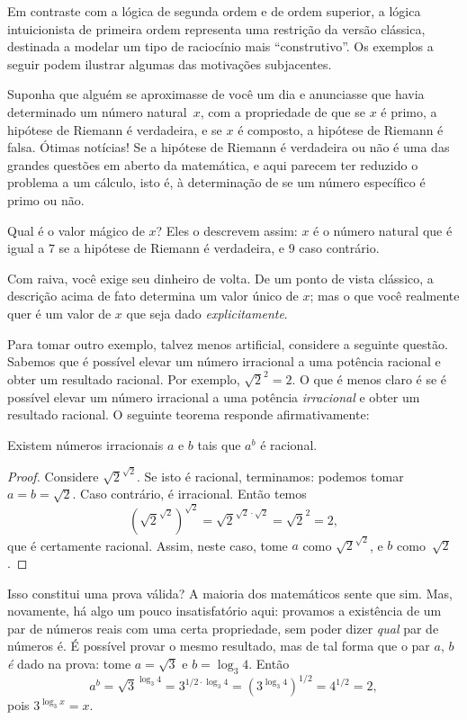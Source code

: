 \documentclass[../../../include/open-logic-section]{subfiles}
\begin{document}


Em contraste com a lógica de segunda ordem e de ordem superior, a lógica
intuicionista de primeira ordem representa uma restrição da versão
clássica, destinada a modelar um tipo de raciocínio mais
``construtivo''. Os exemplos a seguir podem ilustrar algumas das
motivações subjacentes.

Suponha que alguém se aproximasse de você um dia e anunciasse que havia
determinado um número natural~$x$, com a propriedade de que se $x$ é
primo, a hipótese de Riemann é verdadeira, e se $x$ é composto, a
hipótese de Riemann é falsa. Ótimas notícias!{} Se a hipótese de Riemann
é verdadeira ou não é uma das grandes questões em aberto da
matemática, e aqui parecem ter reduzido o problema a um cálculo, isto
é, à determinação de se um número específico é primo ou não.

Qual é o valor mágico de $x$? Eles o descrevem assim: $x$ é o número
natural que é igual a $7$ se a hipótese de Riemann é verdadeira, e $9$
caso contrário.

Com raiva, você exige seu dinheiro de volta. De um ponto de vista
clássico, a descrição acima de fato determina um valor único de $x$;
mas o que você realmente quer é um valor de $x$ que seja dado
\emph{explicitamente}.

Para tomar outro exemplo, talvez menos artificial, considere a
seguinte questão. Sabemos que é possível elevar um número irracional a
uma potência racional e obter um resultado racional. Por exemplo,
$\sqrt{2}^2 = 2$. O que é menos claro é se é possível elevar um número
irracional a uma potência \emph{irracional} e obter um resultado
racional. O seguinte teorema responde afirmativamente:

\begin{thm}
Existem números irracionais $a$ e $b$ tais que $a^b$ é racional.
\end{thm}

\begin{proof}
Considere $\sqrt{2}^{\sqrt{2}}$. Se isto é racional, terminamos:
podemos tomar $a = b = \sqrt{2}$. Caso contrário, é irracional. Então
temos
\[
(\sqrt{2}^{\sqrt{2}})^{\sqrt{2}} = \sqrt{2}^{\sqrt{2} \cdot
  \sqrt{2}} = \sqrt{2}^2 = 2,
\]
que é certamente racional. Assim, neste caso, tome $a$ como
$\sqrt{2}^{\sqrt{2}}$, e $b$ como~$\sqrt 2$.
\end{proof}

Isso constitui uma prova válida? A maioria dos matemáticos sente que
sim. Mas, novamente, há algo um pouco insatisfatório aqui: provamos a
existência de um par de números reais com uma certa propriedade, sem
poder dizer \emph{qual} par de números é.  É possível provar o mesmo
resultado, mas de tal forma que o par $a$, $b$ \emph{é} dado na prova:
tome $a = \sqrt{3}$ e $b = \log_3 4$. Então
\[
a^b = \sqrt{3}^{\log_3 4} = 3^{1/2 \cdot \log_3 4} = (3^{\log_3
  4})^{1/2} = 4^{1/2}= 2,
\]
pois $3^{\log_3 x} = x$.
\end{document}
